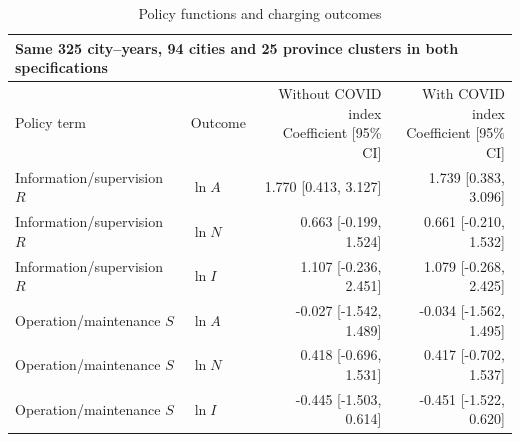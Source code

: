 \begin{table}[htbp]\centering\small\caption{Policy functions and charging outcomes}\label{tab:policy_associations}
\begin{tabular}{@{}p{43mm}lrr@{}}\toprule
\multicolumn{4}{l}{Same 325 city--years, 94 cities and 25 province clusters in both specifications}\\\midrule
Policy term & Outcome & \shortstack{Without COVID index\\Coefficient [95\% CI]} & \shortstack{With COVID index\\Coefficient [95\% CI]}\\
\midrule
Information/supervision $R$ & $\ln A$ & 1.770 [0.413, 3.127] & 1.739 [0.383, 3.096]\\
Information/supervision $R$ & $\ln N$ & 0.663 [-0.199, 1.524] & 0.661 [-0.210, 1.532]\\
Information/supervision $R$ & $\ln I$ & 1.107 [-0.236, 2.451] & 1.079 [-0.268, 2.425]\\
Operation/maintenance $S$ & $\ln A$ & -0.027 [-1.542, 1.489] & -0.034 [-1.562, 1.495]\\
Operation/maintenance $S$ & $\ln N$ & 0.418 [-0.696, 1.531] & 0.417 [-0.702, 1.537]\\
Operation/maintenance $S$ & $\ln I$ & -0.445 [-1.503, 0.614] & -0.451 [-1.522, 0.620]\\
\bottomrule\end{tabular}\end{table}
